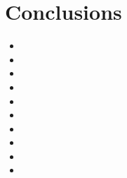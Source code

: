\chapter{Conclusions}
\label{chp:conclusions}

\begin{itemize}

  \item 
  
  \item
  
  \item
  
  \item 
  
  \item 
  
  \item 
  
  \item
  
  \item
  
  \item 
  
  \item 
  
\end{itemize}